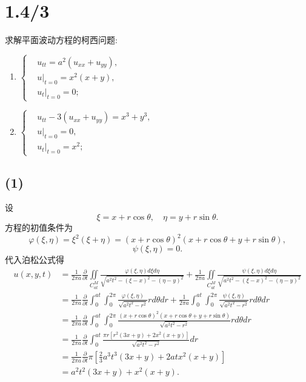 \documentclass[11pt,a4paper]{article}
\begin{document}
\section{1.4/3}
\begin{problem}
求解平面波动方程的柯西问题:
\begin{enumerate}
  \item $\left\{
          \begin{aligned}
             & u_{tt}=a^2(u_{xx}+u_{yy}), \\
             & u|_{t=0}=x^2(x+y),         \\
             & u_t|_{t=0}=0;
          \end{aligned}
          \right.$
  \item $\left\{
          \begin{aligned}
             & u_{tt}-3(u_{xx}+u_{yy})=x^3+y^3, \\
             & u|_{t=0}=0,                      \\
             & u_t|_{t=0}=x^2;
          \end{aligned}
          \right.$
\end{enumerate}
\end{problem}

\subsection*{(1)}
设
$$\xi=x+r\cos\theta,\quad \eta=y+r\sin\theta.$$
方程的初值条件为
$$\varphi(\xi,\eta)=\xi^2(\xi+\eta)=(x+r\cos\theta)^2(x+r\cos\theta+y+r\sin\theta),$$
$$\psi(\xi,\eta)=0.$$
代入泊松公式得
\begin{align*}
  u(x,y,t)
   & =\frac{1}{2\pi a}\frac{\partial}{\partial t}\iint\limits_{C_{at}^M}\frac{\varphi(\xi,\eta)d\xi d\eta}{\sqrt{a^2t^2-(\xi-x)^2-(\eta-y)^2}}+
  \frac{1}{2\pi a}\iint\limits_{C_{at}^M}\frac{\psi(\xi,\eta)d\xi d\eta}{\sqrt{a^2t^2-(\xi-x)^2-(\eta-y)^2}}                                                 \\
   & =\frac{1}{2\pi a}\frac{\partial}{\partial t}\int_0^{at}\int_0^{2\pi}\frac{\varphi(\xi,\eta)}{\sqrt{a^2t^2-r^2}}rd\theta dr+
  \frac{1}{2\pi a}\int_0^{at}\int_0^{2\pi}\frac{\psi(\xi,\eta)}{\sqrt{a^2t^2-r^2}}rd\theta dr                                                                \\
   & =\frac{1}{2\pi a}\frac{\partial}{\partial t}\int_0^{at}\int_0^{2\pi}\frac{(x+r\cos\theta)^2(x+r\cos\theta+y+r\sin\theta)}{\sqrt{a^2t^2-r^2}}rd\theta dr \\
   & =\frac{1}{2\pi a}\frac{\partial}{\partial t}\int_0^{at} \frac{\pi r \left[r^2 (3 x+y)+2 x^2 (x+y)\right]}{\sqrt{a^2 t^2-r^2}} dr                        \\
   & =\frac{1}{2\pi a}\frac{\partial}{\partial t}\pi  \left[\frac{2}{3} a^3 t^3 (3 x+y)+2 a t x^2 (x+y)\right]                                               \\
   & =a^2 t^2 (3 x+y)+x^2 (x+y).
\end{align*}
\end{document}
